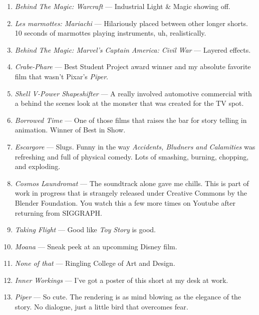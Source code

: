 \documentclass[../main.tex]{subfiles}
\begin{document}
\begin{enumerate}
	\item \textit{Behind The Magic: Warcraft} --- Industrial Light \& Magic showing off.
	\item \textit{Les marmottes: Mariachi} --- Hilariously placed between other longer shorts. 10 seconds of marmottes playing instruments, uh, realistically.
	\item \textit{Behind The Magic: Marvel's Captain America: Civil War} --- Layered effects.
	\item \textit{Crabe-Phare} --- Best Student Project award winner and my absolute favorite film that wasn't Pixar's \textit{Piper}.
	\item \textit{Shell V-Power Shapeshifter} --- A really involved automotive commercial with a behind the scenes look at the monster that was created for the TV spot.
	\item \textit{Borrowed Time} --- One of those films that raises the bar for story telling in animation. Winner of Best in Show.
	\item \textit{Escargore} --- Slugs. Funny in the way \textit{Accidents, Bludners and Calamities} was refreshing and full of physical comedy. Lots of smashing, burning, chopping, and exploding.
	\item \textit{Cosmos Laundromat} --- The soundtrack alone gave me chills. This is part of work in progress that is strangely released under Creative Commons by the Blender Foundation. You watch this a few more times on Youtube after returning from SIGGRAPH.
	\item \textit{Taking Flight} --- Good like \textit{Toy Story} is good.
	\item \textit{Moana} --- Sneak peek at an upcomming Disney film.
	\item \textit{None of that} --- Ringling College of Art and Design.
	\item \textit{Inner Workings} --- I've got a poster of this short at my desk at work.
	\item \textit{Piper} --- So cute. The rendering is as mind blowing as the elegance of the story. No dialogue, just a little bird that overcomes fear.
\end{enumerate}
\end{document}
